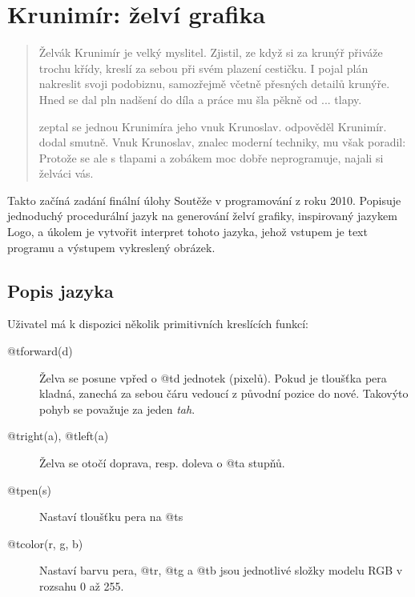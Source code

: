 \chapter{Krunimír: želví grafika}

\begin{quotation}

Želvák Krunimír je velký myslitel. Zjistil, ze když si za krunýř přiváže trochu
křídy, kreslí za sebou při svém plazení cestičku. I pojal plán nakreslit svoji
podobiznu, samozřejmě včetně přesných detailů krunýře. Hned se dal pln nadšení
do díla a práce mu šla pěkně od ... tlapy.

 zeptal se jednou Krunimíra jeho vnuk Krunoslav.
 odpověděl Krunimír.  dodal smutně.   Vnuk Krunoslav, znalec moderní techniky, mu
však poradil: 
Protože se ale s tlapami a zobákem moc dobře neprogramuje, najali si želváci
vás.

\end{quotation}

Takto začíná zadání finální úlohy Soutěže v programování z roku 2010. Popisuje
jednoduchý procedurální jazyk na generování želví grafiky, inspirovaný jazykem
Logo, a úkolem je vytvořit interpret tohoto jazyka, jehož vstupem je text
programu a výstupem vykreslený obrázek.


\section{Popis jazyka}

Uživatel má k dispozici několik primitivních kreslících funkcí:

\begin{description}
\item[@t{forward(d)}] Želva se posune vpřed o @t{d} jednotek (pixelů).
Pokud je tloušťka pera kladná, zanechá za sebou čáru vedoucí z původní pozice do
nové. Takovýto pohyb se považuje za jeden \emph{tah}.
\item[@t{right(a)}, @t{left(a)}] Želva se otočí doprava, resp. doleva o
@t{a} stupňů.
\item[@t{pen(s)}] Nastaví tloušťku pera na @t{s}
\item[@t{color(r, g, b)}] Nastaví barvu pera, @t{r}, @t{g} a
@t{b} jsou jednotlivé složky modelu RGB v rozsahu 0 až 255.
\end{description}

